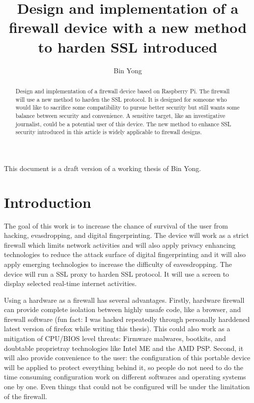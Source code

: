 \documentclass[mscthesis]{usiinfthesis}
\title{Design and implementation of a firewall device with a new method to harden SSL introduced} %
\author{Bin Yong} %
\begin{document}
\maketitle %

\frontmatter %

\begin{abstract}
  Design and implementation of a firewall device based on Raspberry Pi.
  The firewall will use a new method to harden the SSL protocol. It is 
  designed for someone who would like to sacrifice some compatibility 
  to pursue better security but still wants some balance between 
  security and convenience. A sensitive target, like an investigative 
  journalist, could be a potential user of this device. The new method
  to enhance SSL security introduced in this article is widely 
  applicable to firewall designs.

\end{abstract}

\begin{acknowledgements}
  This document is a draft version of a working thesis of Bin Yong.
\end{acknowledgements}

\tableofcontents 
\listoffigures %
\listoftables %

\mainmatter

\chapter{Introduction}
The goal of this work is to increase the chance of survival of the user 
from hacking, evasdropping, and digital fingerprinting. The device will 
work as a strict firewall which limits network activities and will also
apply privacy enhancing technologies to reduce the attack surface of 
digital fingerprinting and it will also apply emerging technologies to 
increase the difficulty of eavesdropping. The device will run a SSL proxy 
to harden SSL protocol. It will use a screen to display selected real-time 
internet activities.\par
Using a hardware as a firewall has several advantages. Firstly, hardware 
firewall can provide complete isolation between highly unsafe code, 
like a browser, and firewall software (fun fact: I was hacked repeatedly 
through personally harddened latest version of firefox while writing this 
thesis). This could also work as a mitigation of CPU/BIOS level threats: 
Firmware malwares, bootkits, and doubtable proprietray technologies like 
Intel ME and the AMD PSP. Second, it will also provide convenience to the 
user: the configuration of this portable device will be applied to protect 
everything behind it, so people do not need to do the time consuming 
configuration work on different softwares and operating systems one by one. 
Even things that could not be configured will be under the limitation of 
the firewall. 
\end{document}
